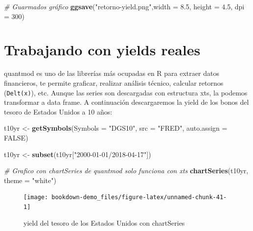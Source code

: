 \documentclass[12pt,]{book}
\newenvironment{Shaded}{\begin{snugshade}}{\end{snugshade}}
\newcommand{\KeywordTok}[1]{\textcolor[rgb]{0.13,0.29,0.53}{\textbf{#1}}}
\newcommand{\DataTypeTok}[1]{\textcolor[rgb]{0.13,0.29,0.53}{#1}}
\newcommand{\DecValTok}[1]{\textcolor[rgb]{0.00,0.00,0.81}{#1}}
\newcommand{\FloatTok}[1]{\textcolor[rgb]{0.00,0.00,0.81}{#1}}
\newcommand{\StringTok}[1]{\textcolor[rgb]{0.31,0.60,0.02}{#1}}
\newcommand{\CommentTok}[1]{\textcolor[rgb]{0.56,0.35,0.01}{\textit{#1}}}
\newcommand{\OtherTok}[1]{\textcolor[rgb]{0.56,0.35,0.01}{#1}}
\newcommand{\NormalTok}[1]{#1}
\begin{document}
\begin{Shaded}
\begin{Highlighting}[]
\CommentTok{# Guarmados gráfico}
\KeywordTok{ggsave}\NormalTok{(}\StringTok{"retorno-yield.png"}\NormalTok{,}\DataTypeTok{width =} \FloatTok{8.5}\NormalTok{, }\DataTypeTok{height =} \FloatTok{4.5}\NormalTok{, }\DataTypeTok{dpi =} \DecValTok{300}\NormalTok{)}
\end{Highlighting}
\end{Shaded}

\section{Trabajando con yields
reales}\label{trabajando-con-yields-reales}

quantmod es uno de las librerías más ocupadas en R para extraer datos
financieros, te permite graficar, realizar análisis técnico, calcular
retornos (\texttt{Delt(x)}), etc. Aunque las series son descargadas con
estructura xts, la podemos transformar a data frame. A continuación
descargaremos la yield de los bonos del tesoro de Estados Unidos a 10
años:

\begin{Shaded}
\begin{Highlighting}[]
\NormalTok{t10yr <-}\StringTok{ }\KeywordTok{getSymbols}\NormalTok{(}\DataTypeTok{Symbols =} \StringTok{"DGS10"}\NormalTok{, }\DataTypeTok{src =} \StringTok{"FRED"}\NormalTok{, }\DataTypeTok{auto.assign =} \OtherTok{FALSE}\NormalTok{)}

\NormalTok{t10yr <-}\StringTok{ }\KeywordTok{subset}\NormalTok{(t10yr[}\StringTok{"2000-01-01/2018-04-17"}\NormalTok{])}
\end{Highlighting}
\end{Shaded}

\begin{Shaded}
\begin{Highlighting}[]
\CommentTok{# Grafico con chartSeries de quantmod solo funciona con xts}
\KeywordTok{chartSeries}\NormalTok{(t10yr,  }\DataTypeTok{theme =} \StringTok{"white"}\NormalTok{)}
\end{Highlighting}
\end{Shaded}

\begin{figure}

{\centering \texttt{[image: bookdown-demo\_files/figure-latex/unnamed-chunk-41-1]} 

}

\caption{yield del tesoro de los Estados Unidos con chartSeries}\label{fig:unnamed-chunk-41}
\end{figure}
\end{document}
